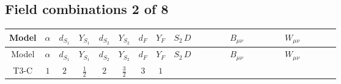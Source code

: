 \documentclass[8pt]{article}
\begin{document}
\begin{landscape}
\subsection*{Field combinations 2 of 8}
\begin{longtable}{@{}cccccccc >{\raggedright\arraybackslash}p{0.21\linewidth} >{\raggedright\arraybackslash}p{0.21\linewidth} >{\raggedright\arraybackslash}p{0.21\linewidth}@{}}
\toprule
Model & $\alpha$ & $d_{S_1}$ & $Y_{S_1}$ & $d_{S_2}$ & $Y_{S_2}$ & $d_F$ & $Y_F$ & $S_2\,D$ & $B_{\mu\nu}$ & $W_{\mu\nu}$ \\
\midrule
\endfirsthead
\toprule
Model & $\alpha$ & $d_{S_1}$ & $Y_{S_1}$ & $d_{S_2}$ & $Y_{S_2}$ & $d_F$ & $Y_F$ & $S_2\,D$ & $B_{\mu\nu}$ & $W_{\mu\nu}$ \\
\midrule
\endhead
T3-C & $1$ & $2$ & $\frac{1}{2}$ & $2$ & $\frac{3}{2}$ & $3$ & $1$ & \scriptsize\adjustbox{max width=\linewidth}{$\begin{gathered} +D_{\mu _1}\left(S_{2,j_1}\right){}^{\dagger } D_{\mu _1}\left(S_{2,j_1}\right)\end{gathered}$} & \scriptsize\adjustbox{max width=\linewidth}{$\begin{gathered} -\frac{3 \hbar  B_{\mu _1\mu _2}^2}{\epsilon }\end{gathered}$} & \scriptsize\adjustbox{max width=\linewidth}{$\begin{gathered} -\frac{2 \hbar  \left(W_{\mu _1\mu _2}^{A_1}\right){}^2}{\epsilon }\end{gathered}$} \\
\midrule
\bottomrule
\end{longtable}
\clearpage

\end{landscape}
\end{document}

